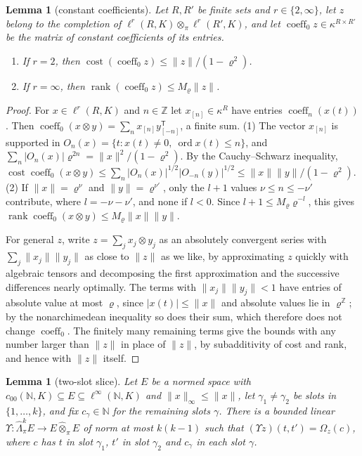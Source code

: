 \documentclass[11pt]{amsart}
\newtheorem{lemma}[theorem]{Lemma}
\theoremstyle{definition}
\theoremstyle{remark}
\numberwithin{equation}{section}
\newcommand{\N}{\mathbb N}
\newcommand{\Z}{\mathbb Z}
\newcommand{\linf}{\ell^\infty}
\newcommand{\abs}[1]{\lvert #1\rvert}
\newcommand{\norm}[1]{\lVert #1\rVert}
\newcommand{\coeff}{\operatorname{coeff}}
\newcommand{\ord}{\operatorname{ord}}
\newcommand{\rank}{\operatorname{rank}}
\theoremstyle{plain}
\theoremstyle{definition}
\theoremstyle{plain}
\begin{document}
\begin{lemma}[constant coefficients]\label{fib:lem:coeff}
Let $R,R'$ be finite sets and $r\in\{2,\infty\}$, let $z$ belong to the completion of
$\ell^r(R,K)\otimes_\pi\ell^r(R',K)$, and let $\coeff_0z\in\kappa^{R\times R'}$ be the matrix of constant coefficients of
its entries.
\begin{enumerate}
\item If $r=2$, then $\operatorname{cost}(\coeff_0z)\le\norm z/(1-\varrho^2)$.
\item If $r=\infty$, then $\rank(\coeff_0z)\le M_\varrho\norm z$.
\end{enumerate}
\end{lemma}

\begin{proof}
For $x\in\ell^r(R,K)$ and $n\in\Z$ let $x_{[n]}\in\kappa^R$ have entries $\coeff_n(x(t))$. Then
$\coeff_0(x\otimes y)=\sum_nx_{[n]}y_{[-n]}^{\mathsf T}$, a finite sum.
(1) The vector $x_{[n]}$ is supported in $O_n(x)=\{t:x(t)\ne0,\ \ord x(t)\le n\}$, and
$\sum_n\abs{O_n(x)}\varrho^{2n}=\norm x^2/(1-\varrho^2)$. By the Cauchy--Schwarz inequality,
$\operatorname{cost}\coeff_0(x\otimes y)\le\sum_n\abs{O_n(x)}^{1/2}\abs{O_{-n}(y)}^{1/2}\le\norm x\norm y/(1-\varrho^2)$.
(2) If $\norm x=\varrho^\nu$ and $\norm y=\varrho^{\nu'}$, only the $l+1$ values $\nu\le n\le-\nu'$ contribute, where
$l=-\nu-\nu'$, and none if $l<0$. Since $l+1\le M_\varrho\varrho^{-l}$, this gives
$\rank\coeff_0(x\otimes y)\le M_\varrho\norm x\norm y$.

For general $z$, write $z=\sum_jx_j\otimes y_j$ as an absolutely convergent series with
$\sum_j\norm{x_j}\norm{y_j}$ as close to $\norm z$ as we like, by approximating $z$ quickly with algebraic tensors and decomposing the
first approximation and the successive differences nearly optimally. The terms with $\norm{x_j}\norm{y_j}<1$ have
entries of absolute value at most $\varrho$, since $\abs{x(t)}\le\norm x$ and absolute values lie in $\varrho^\Z$; by
the nonarchimedean inequality so does their sum, which therefore does not change $\coeff_0$. The finitely many
remaining terms give the bounds with any number larger than $\norm z$ in place of $\norm z$, by subadditivity of cost
and rank, and hence with $\norm z$ itself.
\end{proof}

\begin{lemma}[two-slot slice]\label{fib:lem:slice}
Let $E$ be a normed space with $c_{00}(\N,K)\subseteq E\subseteq\linf(\N,K)$ and $\norm x_\infty\le\norm x$, let
$\gamma_1\ne\gamma_2$ be slots in $\{1,\dots,k\}$, and fix $c_\gamma\in\N$ for the remaining slots $\gamma$. There is a
bounded linear $\Upsilon\colon\widehat\Lambda^k_\pi E\to E\widehat\otimes_\pi E$ of norm at most $k(k-1)$ such that
$(\Upsilon z)(t,t')=\Omega_z(c)$, where $c$ has $t$ in slot $\gamma_1$, $t'$ in slot $\gamma_2$ and $c_\gamma$ in each slot
$\gamma$.
\end{lemma}
\end{document}
